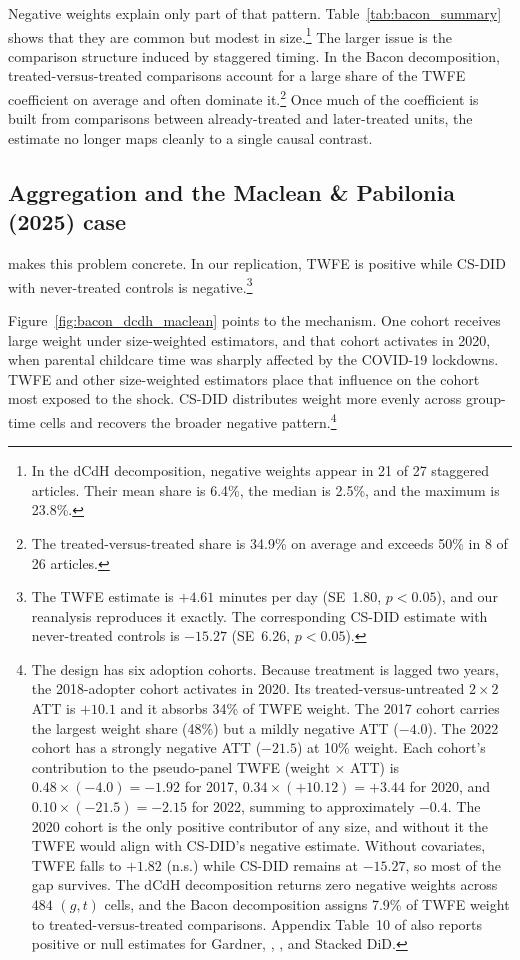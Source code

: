Negative weights explain only part of that pattern. Table~\ref{tab:bacon_summary} shows that they are common but modest in size.\footnote{In the dCdH decomposition, negative weights appear in 21 of 27 staggered articles. Their mean share is 6.4\%, the median is 2.5\%, and the maximum is 23.8\%.} The larger issue is the comparison structure induced by staggered timing. In the Bacon decomposition, treated-versus-treated comparisons account for a large share of the TWFE coefficient on average and often dominate it.\footnote{The treated-versus-treated share is 34.9\% on average and exceeds 50\% in 8 of 26 articles.} Once much of the coefficient is built from comparisons between already-treated and later-treated units, the estimate no longer maps cleanly to a single causal contrast.


\subsection{Aggregation and the Maclean \& Pabilonia (2025) case}

\textcite{maclean2025paid} makes this problem concrete. In our replication, TWFE is positive while CS-DID with never-treated controls is negative.\footnote{The TWFE estimate is \(+4.61\) minutes per day (SE~1.80, \(p<0.05\)), and our reanalysis reproduces it exactly. The corresponding CS-DID estimate with never-treated controls is \(-15.27\) (SE~6.26, \(p<0.05\)).}

Figure~\ref{fig:bacon_dcdh_maclean} points to the mechanism. One cohort receives large weight under size-weighted estimators, and that cohort activates in 2020, when parental childcare time was sharply affected by the COVID-19 lockdowns. TWFE and other size-weighted estimators place that influence on the cohort most exposed to the shock. CS-DID distributes weight more evenly across group-time cells and recovers the broader negative pattern.\footnote{The design has six adoption cohorts. Because treatment is lagged two years, the 2018-adopter cohort activates in 2020. Its treated-versus-untreated \(2\times2\) ATT is \(+10.1\) and it absorbs 34\% of TWFE weight. The 2017 cohort carries the largest weight share (48\%) but a mildly negative ATT (\(-4.0\)). The 2022 cohort has a strongly negative ATT (\(-21.5\)) at 10\% weight. Each cohort's contribution to the pseudo-panel TWFE (weight \(\times\) ATT) is \(0.48\times(-4.0)=-1.92\) for 2017, \(0.34\times(+10.12)=+3.44\) for 2020, and \(0.10\times(-21.5)=-2.15\) for 2022, summing to approximately \(-0.4\). The 2020 cohort is the only positive contributor of any size, and without it the TWFE would align with CS-DID's negative estimate. Without covariates, TWFE falls to \(+1.82\) (n.s.) while CS-DID remains at \(-15.27\), so most of the gap survives. The dCdH decomposition returns zero negative weights across \(484\) \((g,t)\) cells, and the Bacon decomposition assigns 7.9\% of TWFE weight to treated-versus-treated comparisons. Appendix Table~10 of \textcite{maclean2025paid} also reports positive or null estimates for Gardner, \textcite{borusyak2024revisiting}, \textcite{wooldridge2025two}, and Stacked DiD.}

